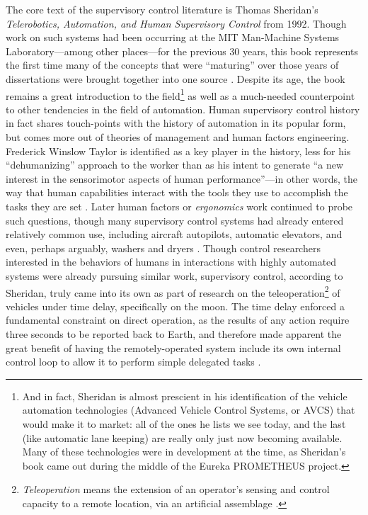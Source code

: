 The core text of the supervisory control literature is Thomas
Sheridan's \emph{Telerobotics, Automation, and Human Supervisory
  Control} from 1992. Though work on such systems had been occurring
at the MIT Man-Machine Systems Laboratory---among other places---for
the previous 30 years, this book represents the first time many of the
concepts that were ``maturing'' over those years of dissertations were
brought together into one source \cite[p. xix]{sheridan}. Despite its
age, the book remains a great introduction to the field\footnote{And in fact, Sheridan is almost prescient in his
  identification of the vehicle automation technologies (Advanced
  Vehicle Control Systems, or AVCS) that would
  make it to market: all of the ones he lists we see today, and the
  last (like automatic lane keeping) are really only just now becoming
  available. Many of these technologies were in development at the
  time, as Sheridan's book came out during the middle of the Eureka
  PROMETHEUS project.} as well as a
much-needed counterpoint to other tendencies in the field of
automation. Human supervisory control history in fact
shares touch-points with the history of automation in its popular
form, but comes more out of theories of management and human factors
engineering. Frederick Winslow Taylor is identified as a key player in
the history, less for his ``dehumanizing'' approach to the worker than
as
his intent to generate ``a new interest in the sensorimotor aspects of
human performance''---in other words, the way that human capabilities
interact with the tools they use to accomplish the tasks they are
set \cite[p. 7]{sheridan}. Later human factors or \emph{ergonomics}
work continued to probe such questions, though many supervisory
control systems had already entered relatively common use, including
aircraft autopilots, automatic elevators, and even, perhaps arguably,
washers and dryers \cite[p. 8]{sheridan}. Though control researchers
interested in the behaviors of humans in interactions with highly
automated systems were already pursuing similar work, supervisory
control, according to Sheridan, truly came into its own as part of
research on the teleoperation\footnote{\emph{Teleoperation} means the
  extension of an operator's sensing and control capacity to a remote
  location, via an artificial assemblage \cite[p. 4]{sheridan}.} of vehicles under time delay,
specifically on the moon. The time delay enforced a fundamental
constraint on direct operation, as the results of any action require
three seconds to be reported back to Earth, and therefore made
apparent the great benefit of having the remotely-operated system
include its own internal control loop to allow it to perform simple
delegated tasks \cite[p. 9]{sheridan}.

